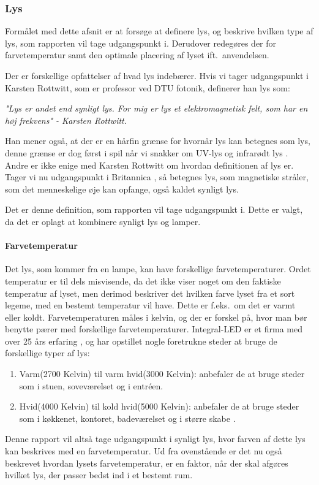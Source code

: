 \subsubsection{Lys}
\label{sec:lys}
Formålet med dette afsnit er at forsøge at definere lys, og beskrive hvilken type af lys, som rapporten vil tage udgangspunkt i. Derudover redegøres der for farvetemperatur samt den optimale placering af lyset ift.\ anvendelsen.


Der er forskellige opfattelser af hvad lys indebærer. Hvis vi tager udgangspunkt i Karsten Rottwitt, som er professor ved DTU fotonik, definerer han lys som:


\textit{"Lys er andet end synligt lys. For mig er lys et elektromagnetisk felt, som har en høj frekvens"
- Karsten Rottwitt\cite{def_lys}.}

Han mener også, at der er en hårfin grænse for hvornår lys kan betegnes som lys, denne grænse er dog først i spil når vi snakker om UV-lys og infrarødt lys \cite{def_lys}. 
Andre er ikke enige med Karsten Rottwitt om hvordan definitionen af lys er. Tager vi nu udgangspunkt i Britannica \cite{britannica_lys}, så betegnes lys, som magnetiske stråler, som det menneskelige øje kan opfange, også kaldet synligt lys. 


Det er denne definition, som rapporten vil tage udgangspunkt i. Dette er valgt, da det er oplagt at kombinere synligt lys og lamper.

\paragraph{Farvetemperatur}
Det lys, som kommer fra en lampe, kan have forskellige farvetemperaturer. Ordet temperatur er til dels misvisende, da det ikke viser noget om den faktiske temperatur af lyset, men derimod beskriver det hvilken farve lyset fra et sort legeme, med en bestemt temperatur vil have\cite{farvetemp}. Dette er f.eks.\ om det er varmt eller koldt. Farvetemperaturen måles i kelvin, og der er forskel på, hvor man bør benytte pærer med forskellige farvetemperaturer. Integral-LED er et firma med over 25 års erfaring \cite{integral_led}, og har opstillet nogle foretrukne steder at bruge de forskellige typer af lys:

\begin{enumerate}
\item Varm(2700 Kelvin) til varm hvid(3000 Kelvin): anbefaler de at bruge steder som i stuen, soveværelset og i entréen.
\item Hvid(4000 Kelvin) til kold hvid(5000 Kelvin): anbefaler de at bruge steder som i køkkenet, kontoret, badeværelset og i større skabe \cite{varm_kold}.
\end{enumerate}

Denne rapport vil altså tage udgangspunkt i synligt lys, hvor farven af dette lys kan beskrives med en farvetemperatur. Ud fra ovenstående er det nu også beskrevet hvordan lysets farvetemperatur, er en faktor, når der skal afgøres hvilket lys, der passer bedst ind i et bestemt rum.
